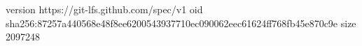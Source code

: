 version https://git-lfs.github.com/spec/v1
oid sha256:87257a440568e48f8ee6200543937710ec090062eec61624ff768fb45e870c9e
size 2097248

